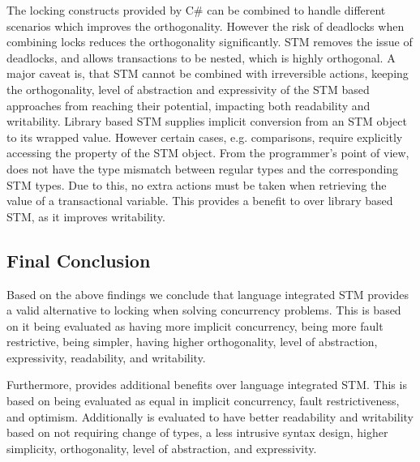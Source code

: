 The locking constructs provided by C\#  can be  combined to handle different scenarios which improves the orthogonality. However the risk of deadlocks when combining locks reduces the orthogonality significantly. \ac{STM} removes the issue of deadlocks, and allows transactions to be nested, which is highly orthogonal. A major caveat is, that \ac{STM} cannot be combined with irreversible actions, keeping the orthogonality, level of abstraction and expressivity of the \ac{STM} based approaches from reaching their potential, impacting both readability and writability. Library based \ac{STM} supplies implicit conversion from an \ac{STM} object to its wrapped value. However certain cases,  e.g. comparisons, require explicitly accessing the  property of the \ac{STM} object. From the programmer's point of view, \stmname does not have the type mismatch between regular types and the corresponding \ac{STM} types. Due to this, no extra actions must be taken when retrieving the value of a transactional variable. This provides a benefit to \stmname over library based \ac{STM}, as it improves writability.

\subsection{Final Conclusion}
Based on the above findings we conclude that language integrated \ac{STM} provides a valid alternative to locking when solving concurrency problems. This is based on it being evaluated as having more implicit concurrency, being more fault restrictive, being simpler, having higher orthogonality, level of abstraction, expressivity, readability, and writability.

Furthermore, \stmname provides additional benefits over language integrated \ac{STM}. This is based on being evaluated as equal in implicit concurrency, fault restrictiveness, and optimism. Additionally \stmname is evaluated to have better readability and writability based on not requiring change of types, a less intrusive syntax design, higher simplicity, orthogonality, level of abstraction, and expressivity.

\worksheetend